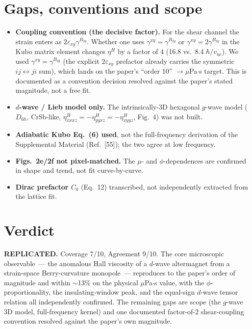 \documentclass[11pt,a4paper]{article}
\newcommand{\vuc}{v_{\mathrm{uc}}}
\newcommand{\etaH}{\eta^{H}}
\begin{document}
\section{Gaps, conventions and scope}
\label{sec:gaps}
\begin{itemize}
\item \textbf{Coupling convention (the decisive factor).} For the shear channel
the strain enters as $2\varepsilon_{xy}\gamma^{B_{2g}}$. Whether one uses
$\gamma^{xy}=\gamma^{B_{2g}}$ or $\gamma^{xy}=2\gamma^{B_{2g}}$ in the Kubo matrix
element changes $\etaH$ by a factor of $4$ (16.8 vs.\ 8.4 $\hbar/\vuc$). We used
$\gamma^{xy}=\gamma^{B_{2g}}$ (the explicit $2\varepsilon_{xy}$ prefactor already
carries the symmetric $ij\leftrightarrow ji$ sum), which lands on the paper's
``order 10'' $\to\mu$Pa$\cdot$s target. This is documented as a convention decision
resolved against the paper's stated magnitude, not a free fit.
\item \textbf{$d$-wave / Lieb model only.} The intrinsically-3D hexagonal $g$-wave
model ($D_{6h}$, CrSb-like, $\eta^{H}_{xxxz}=-\eta^{H}_{yyxz}=-\eta^{H}_{xyyz}$,
Fig.~4) was not built.
\item \textbf{Adiabatic Kubo Eq.~(6) used}, not the full-frequency derivation of the
Supplemental Material (Ref.~[55]); the two agree at low frequency.
\item \textbf{Figs.~2e/2f not pixel-matched.} The $\mu$- and $\phi$-dependences are
confirmed in shape and trend, not fit curve-by-curve.
\item \textbf{Dirac prefactor $C_0$} (Eq.~12) transcribed, not independently
extracted from the lattice fit.
\end{itemize}

\section{Verdict}
\textbf{REPLICATED.} Coverage 7/10, Agreement 9/10. The core microscopic
observable~--- the anomalous Hall viscosity of a $d$-wave altermagnet from a
strain-space Berry-curvature monopole~--- reproduces to the paper's order of
magnitude and within $\sim$13\% on the physical $\mu$Pa$\cdot$s value, with the
$\phi$-proportionality, the insulating-window peak, and the equal-sign $d$-wave
tensor relation all independently confirmed. The remaining gaps are scope
(the $g$-wave 3D model, full-frequency kernel) and one documented factor-of-2
shear-coupling convention resolved against the paper's own magnitude.
\end{document}
